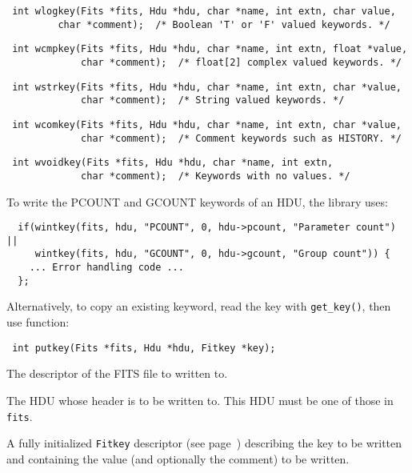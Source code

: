 \label{wlogkey}\begin{verbatim}
 int wlogkey(Fits *fits, Hdu *hdu, char *name, int extn, char value,
	     char *comment);  /* Boolean 'T' or 'F' valued keywords. */
\end{verbatim}

\label{wcmpkey}\begin{verbatim}
 int wcmpkey(Fits *fits, Hdu *hdu, char *name, int extn, float *value,
             char *comment);  /* float[2] complex valued keywords. */
\end{verbatim}

\label{wstrkey}\begin{verbatim}
 int wstrkey(Fits *fits, Hdu *hdu, char *name, int extn, char *value,
             char *comment);  /* String valued keywords. */
\end{verbatim}

\label{wcomkey}\begin{verbatim}
 int wcomkey(Fits *fits, Hdu *hdu, char *name, int extn, char *value,
             char *comment);  /* Comment keywords such as HISTORY. */
\end{verbatim}

\label{wvoidkey}\begin{verbatim}
 int wvoidkey(Fits *fits, Hdu *hdu, char *name, int extn,
             char *comment);  /* Keywords with no values. */
\end{verbatim}

To write the PCOUNT and GCOUNT keywords of an HDU, the library uses:
\begin{verbatim}
  if(wintkey(fits, hdu, "PCOUNT", 0, hdu->pcount, "Parameter count") ||
     wintkey(fits, hdu, "GCOUNT", 0, hdu->gcount, "Group count")) {
    ... Error handling code ...
  };
\end{verbatim}

Alternatively, to copy an existing keyword, read the key with \verb`get_key()`,
then use function:
\label{putkey}\begin{verbatim}
 int putkey(Fits *fits, Hdu *hdu, Fitkey *key);
\end{verbatim}
\begin{arglist}

 The descriptor of the FITS file to written to.

 The HDU whose header is to be written to. This HDU must be
            one of those in \verb`fits`.

 A fully initialized \verb`Fitkey` descriptor (see
            page~\pageref{Fitkey}) describing the key
            to be written and containing the value (and optionally the
            comment) to be written.
\end{arglist}

